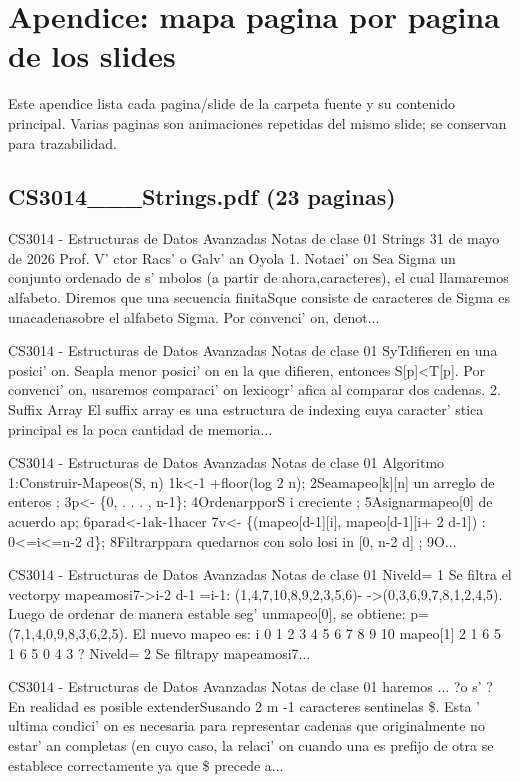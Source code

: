 \clearpage
\section{Apendice: mapa pagina por pagina de los slides}
Este apendice lista cada pagina/slide de la carpeta fuente y su contenido principal. Varias paginas son animaciones repetidas del mismo slide; se conservan para trazabilidad.
\subsection*{CS3014\_\_\_Strings.pdf (23 paginas)}
\begin{description}[leftmargin=!,labelwidth=4.2em,style=nextline]
\item[Pag. 1] CS3014 - Estructuras de Datos Avanzadas Notas de clase 01 Strings 31 de mayo de 2026 Prof. V'  ctor Racs' o Galv' an Oyola 1. Notaci' on Sea Sigma un conjunto ordenado de s'  mbolos (a partir de ahora,caracteres), el cual llamaremos alfabeto. Diremos que una secuencia finitaSque consiste de caracteres de Sigma es unacadenasobre el alfabeto Sigma. Por convenci' on, denot...
\item[Pag. 2] CS3014 - Estructuras de Datos Avanzadas Notas de clase 01 SyTdifieren en una posici' on. Seapla menor posici' on en la que difieren, entonces S[p]<T[p]. Por convenci' on, usaremos comparaci' on lexicogr' afica al comparar dos cadenas. 2. Suffix Array El suffix array es una estructura de indexing cuya caracter'  stica principal es la poca cantidad de memoria...
\item[Pag. 3] CS3014 - Estructuras de Datos Avanzadas Notas de clase 01 Algoritmo 1:Construir-Mapeos(S, n) 1k<-1 +floor(log 2 n); 2Seamapeo[k][n] un arreglo de enteros ; 3p<- \{0, . . . , n-1\}; 4OrdenarpporS i creciente ; 5Asignarmapeo[0] de acuerdo ap; 6parad<-1ak-1hacer 7v<- \{(mapeo[d-1][i], mapeo[d-1][i+ 2 d-1]) : 0<=i<=n-2 d\}; 8Filtrarppara quedarnos con solo losi in [0, n-2 d] ; 9O...
\item[Pag. 4] CS3014 - Estructuras de Datos Avanzadas Notas de clase 01 Niveld= 1 Se filtra el vectorpy mapeamosi7->i-2 d-1 =i-1: (1,4,7,10,8,9,2,3,5,6)- ->(0,3,6,9,7,8,1,2,4,5). Luego de ordenar de manera estable seg' unmapeo[0], se obtiene: p= (7,1,4,0,9,8,3,6,2,5). El nuevo mapeo es: i 0 1 2 3 4 5 6 7 8 9 10 mapeo[1] 2 1 6 5 1 6 5 0 4 3 ? Niveld= 2 Se filtrapy mapeamosi7...
\item[Pag. 5] CS3014 - Estructuras de Datos Avanzadas Notas de clase 01 haremos ... ?o s'  ? En realidad es posible extenderSusando 2 m -1 caracteres sentinelas \$. Esta ' ultima condici' on es necesaria para representar cadenas que originalmente no estar'  an completas (en cuyo caso, la relaci' on cuando una es prefijo de otra se establece correctamente ya que \$ precede a...

\end{description}
